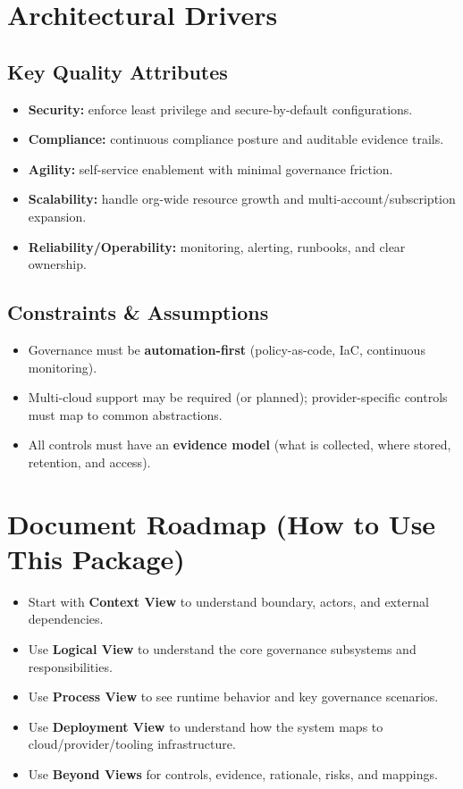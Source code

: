 \documentclass[11pt]{report}
\begin{document}
\section{Architectural Drivers}
\subsection{Key Quality Attributes}
\begin{itemize}
  \item \textbf{Security:} enforce least privilege and secure-by-default configurations.
  \item \textbf{Compliance:} continuous compliance posture and auditable evidence trails.
  \item \textbf{Agility:} self-service enablement with minimal governance friction.
  \item \textbf{Scalability:} handle org-wide resource growth and multi-account/subscription expansion.
  \item \textbf{Reliability/Operability:} monitoring, alerting, runbooks, and clear ownership.
\end{itemize}

\subsection{Constraints \& Assumptions}
\begin{itemize}
  \item Governance must be \textbf{automation-first} (policy-as-code, IaC, continuous monitoring).
  \item Multi-cloud support may be required (or planned); provider-specific controls must map to common abstractions.
  \item All controls must have an \textbf{evidence model} (what is collected, where stored, retention, and access).
\end{itemize}

\section{Document Roadmap (How to Use This Package)}
\begin{itemize}
  \item Start with \textbf{Context View} to understand boundary, actors, and external dependencies.
  \item Use \textbf{Logical View} to understand the core governance subsystems and responsibilities.
  \item Use \textbf{Process View} to see runtime behavior and key governance scenarios.
  \item Use \textbf{Deployment View} to understand how the system maps to cloud/provider/tooling infrastructure.
  \item Use \textbf{Beyond Views} for controls, evidence, rationale, risks, and mappings.
\end{itemize}
\end{document}

